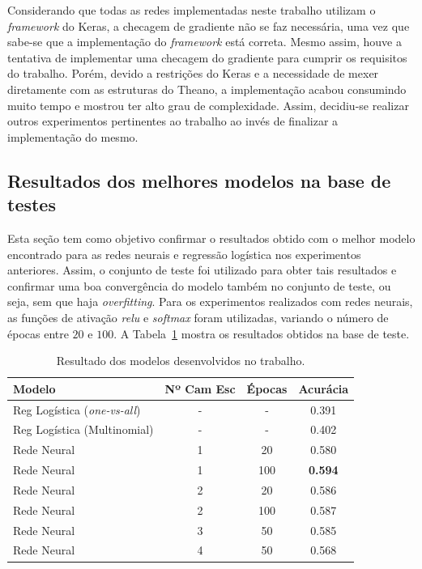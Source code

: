 \documentclass[conference]{IEEEtran}
\begin{document}
Considerando que todas as redes implementadas neste trabalho utilizam o \emph{framework} do Keras, a checagem de gradiente não se faz necessária, uma vez que sabe-se que a implementação do \emph{framework} está correta. Mesmo assim, houve a tentativa de implementar uma checagem do gradiente para cumprir os requisitos do trabalho. Porém, devido a restrições do Keras e a necessidade de mexer diretamente com as estruturas do Theano, a implementação acabou consumindo muito tempo e mostrou ter alto grau de complexidade. Assim, decidiu-se realizar outros experimentos pertinentes ao trabalho ao invés de finalizar a implementação do mesmo.

\subsection{Resultados dos melhores modelos na base de testes}

Esta seção tem como objetivo confirmar o resultados obtido com o melhor modelo encontrado para as redes neurais e regressão logística nos experimentos anteriores. Assim, o conjunto de teste foi utilizado para obter tais resultados e confirmar uma boa convergência do modelo também no conjunto de teste, ou seja, sem que haja \emph{overfitting}. Para os experimentos realizados com redes neurais, as funções de ativação \emph{relu} e \emph{softmax} foram utilizadas, variando o número de épocas entre $20$ e $100$. A Tabela~\ref{tab:result} mostra os resultados obtidos na base de teste.

\begin{table}[h!]
	\centering	
	\begin{tabular}{lccc} \toprule
		\textbf{Modelo} & \textbf{Nº Cam Esc} & \textbf{Épocas} & \textbf{Acurácia}    \\ \toprule 	
		Reg Logística (\emph{one-vs-all}) & - & - & 0.391 \\
		Reg Logística (Multinomial) & - & - & 0.402 \\  \toprule 
	    Rede Neural & 1 & 20  & 0.580 \\
   	    Rede Neural & 1 & 100 & \textbf{0.594} \\
	    Rede Neural & 2 & 20  & 0.586 \\
	    Rede Neural & 2 & 100 & 0.587 \\
	    Rede Neural & 3 & 50  & 0.585 \\
   	    Rede Neural & 4 & 50 &  0.568\\
	    
		\bottomrule      
	\end{tabular}
	\caption{\small Resultado dos modelos desenvolvidos no trabalho.}
	\label{tab:result}
\end{table}
\end{document}
